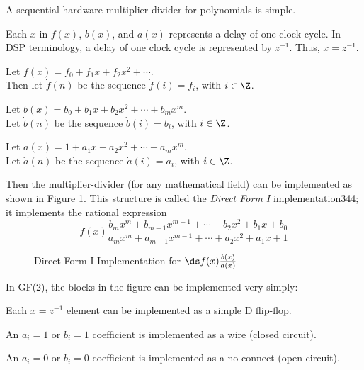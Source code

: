 A sequential hardware multiplier-divider for polynomials is simple.
\begin{liste}
   \item Each $x$ in $f(x)$, $b(x)$, and $a(x)$ represents a delay of one clock cycle.
In DSP terminology, a delay of one clock cycle is represented by $z^{-1}$.
Thus, $x=z^{-1}$.
   \item Let $f(x)=f_0 + f_1x + f_2x^2 + \cdots$.\\
         Then let $\dot{f}(n)$ be the sequence $\dot{f}(i)=f_i$, with $i\in\Z$.
   \item Let $b(x)= b_0 + b_1x + b_2x^2 + \cdots + b_mx^m$.\\
         Let $\dot{b}(n)$ be the sequence $\dot{b}(i)=b_i$, with $i\in\Z$.
   \item Let $a(x)=1 + a_1x + a_2x^2 + \cdots + a_mx^m$.\\
         Let $\dot{a}(n)$ be the sequence $\dot{a}(i)=a_i$, with $i\in\Z$.
\end{liste}
Then the multiplier-divider (for any mathematical field) can be implemented as shown
in Figure \ref{fig:df1}.  
This structure is called the {\em Direct Form I} implementation\citep{os}{344};
it implements the rational expression
\[
   f(x) \frac{b_mx^m + b_{m-1}x^{m-1} + \cdots + b_2x^2 + b_1x + b_0}
             {a_mx^m + a_{m-1}x^{m-1} + \cdots + a_2x^2 + a_1x + 1  }
\]

\begin{figure}[ht]
\caption{
   Direct Form I Implementation for $\ds f(x)\frac{b(x)}{a(x)}$
   \label{fig:df1}
   }
\end{figure}

In GF(2), the blocks in the figure can be implemented very simply:
\begin{liste}
   \item Each $x=z^{-1}$ element can be implemented as a simple D flip-flop.
   \item An $a_i=1$ or $b_i=1$ coefficient is implemented as a wire (closed circuit).
   \item An $a_i=0$ or $b_i=0$ coefficient is implemented as a no-connect (open circuit).
\end{liste}

